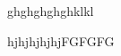 \documentclass{article}
\begin{document}
ghghghghghklkl

hjhjhjhjhjFGFGFG


\printindex 
\end{document}
